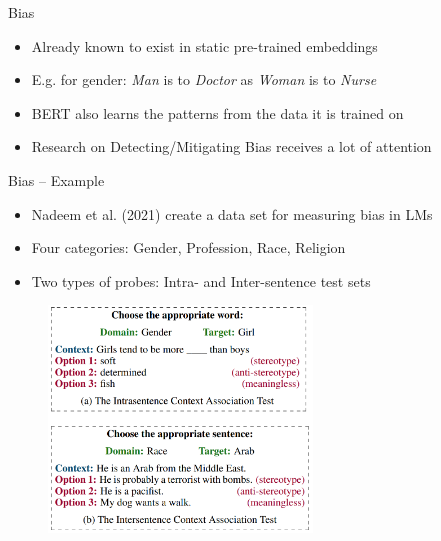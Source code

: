 
\begin{frame}{Bias}

\vfill

\begin{itemize}
	\item Already known to exist in static pre-trained embeddings
	\item E.g. for gender: \textit{Man} is to \textit{Doctor} as \textit{Woman} is to \textit{Nurse}
	\item BERT also learns the patterns from the data it is trained on
	\item Research on Detecting/Mitigating Bias receives a lot of attention
\end{itemize}


\vfill

\end{frame}


\begin{frame}{Bias -- Example \href{https://aclanthology.org/2021.acl-long.416.pdf}{}}

\vfill

\begin{itemize}
	\item Nadeem et al. (2021) create a data set for measuring bias in LMs
	\item Four categories: Gender, Profession, Race, Religion
	\item Two types of probes: Intra- and Inter-sentence test sets
\end{itemize}

\begin{figure}%
\includegraphics[width=7cm]{figure/stereoset.png}%
\end{figure}

\vfill

\end{frame}

